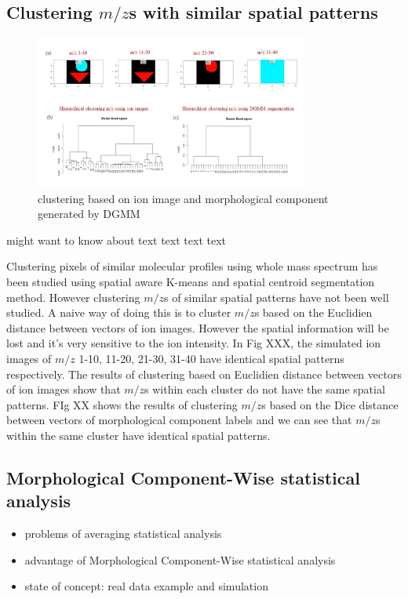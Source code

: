 \documentclass{bioinfo}
\begin{document}
\subsection{Clustering $m/z$s with similar spatial patterns}


\begin{figure}[b!]
    
	\includegraphics[width=0.8\textwidth]{figure7.jpg}
    \caption{clustering based on ion image and morphological component generated by DGMM}
    \label{fig:figure7}
\end{figure}
\citealp{Boffelli03} might want to know about text text text
text\vspace*{1pt}

Clustering pixels of similar molecular profiles using whole mass spectrum has been studied using spatial aware K-means and spatial centroid segmentation method. However clustering $m/z$s of similar spatial patterns have not been well studied. A naive way of doing this is to cluster $m/z$s based on the Euclidien distance between vectors of ion images. However the spatial information will be lost and it's very sensitive to the ion intensity. In Fig XXX, the simulated ion images of $m/z$ 1-10, 11-20, 21-30, 31-40 have identical spatial patterns respectively. The results of clustering based on Euclidien distance between vectors of ion images show that $m/z$s within each cluster do not have the same spatial patterns. FIg XX shows the results of clustering $m/z$s based on the Dice distance between vectors of morphological component labels and we can see that $m/z$s within the same cluster have identical spatial patterns.

\subsection{Morphological Component-Wise statistical analysis}


\begin{itemize}
\item problems of averaging statistical analysis
\item advantage of Morphological Component-Wise statistical analysis
\item state of concept: real data example and simulation
\end{itemize}
\end{document}
